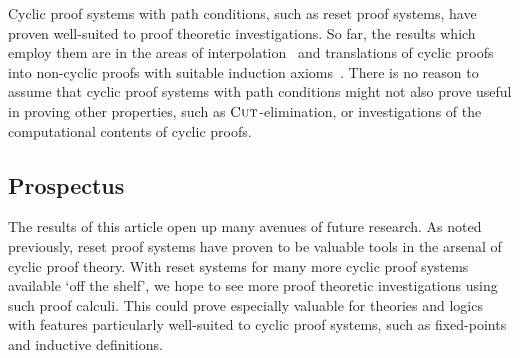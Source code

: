Cyclic proof systems with path conditions, such as reset proof systems, have
proven well-suited to proof theoretic investigations. So far, the results which
employ them are in the areas of
interpolation~\parencite{afshariLyndonInterpolationModal2022,afshariUniformInterpolationCyclic2021,martiFocusSystemAlternationFree2021}
and translations of cyclic proofs into non-cyclic
proofs with suitable induction
axioms~\parencite{afshariCutfreeCompletenessModal2017}. There is no
reason to assume that cyclic proof systems with path conditions might not also
prove useful in proving other properties, such as $\textsc{Cut}$-elimination, or
investigations of the computational contents of cyclic proofs.


\subsection*{Prospectus}
%
The results of this article open up many avenues of future research. As noted
previously, reset proof systems have proven to be valuable tools in the arsenal
of cyclic proof theory. With reset systems for many more cyclic proof systems
available `off the shelf', we hope to see more proof theoretic
investigations using such proof calculi. This could prove
especially valuable for theories and logics with features particularly
well-suited to cyclic proof systems, such as fixed-points and inductive
definitions.

